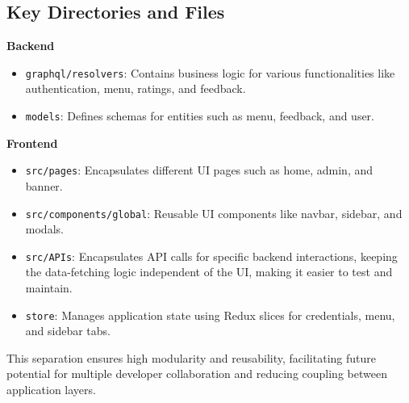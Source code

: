 \documentclass[10pt,twocolumn]{article}
\begin{document}
\subsection{Key Directories and Files}
\textbf{Backend}
\begin{itemize}
    \item \texttt{graphql/resolvers}: Contains business logic for various functionalities like authentication, menu, ratings, and feedback.
    \item \texttt{models}: Defines schemas for entities such as menu, feedback, and user.
\end{itemize}
\textbf{Frontend}
\begin{itemize}
    \item \texttt{src/pages}: Encapsulates different UI pages such as home, admin, and banner.
    \item \texttt{src/components/global}: Reusable UI components like navbar, sidebar, and modals.
    \item \texttt{src/APIs}: Encapsulates API calls for specific backend interactions, keeping the data-fetching logic independent of the UI, making it easier to test and maintain.
    \item \texttt{store}: Manages application state using Redux slices for credentials, menu, and sidebar tabs.
\end{itemize}
This separation ensures high modularity and reusability, facilitating future potential for multiple developer collaboration and reducing coupling between application layers.
\end{document}
